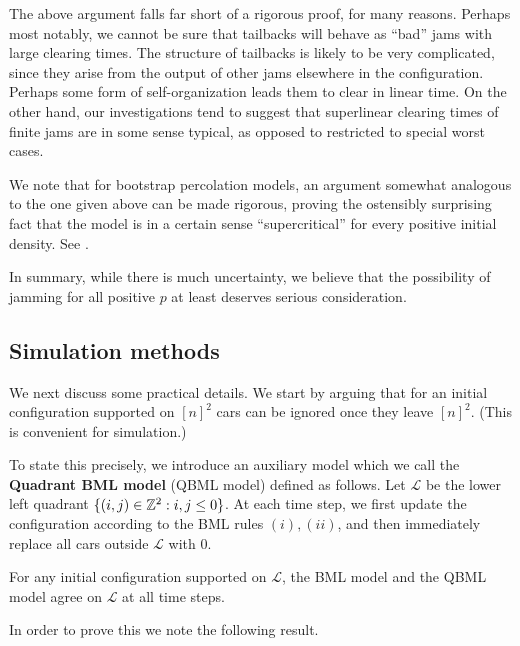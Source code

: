 \documentclass[reqno]{amsart}
\begin{document}
The above argument falls far short of a rigorous proof, for many reasons.  Perhaps most notably, we cannot be sure that tailbacks will behave as ``bad'' jams with large clearing times.  The structure of tailbacks is likely to be very complicated, since they arise from the output of other jams elsewhere in the configuration.  Perhaps some form of self-organization leads them to clear in linear time.  On the other hand, our investigations tend to suggest that superlinear clearing times of finite jams are in some sense typical, as opposed to restricted to special worst cases.

We note that for bootstrap percolation models, an argument somewhat analogous to the one given above can be made rigorous, proving the ostensibly surprising fact that the model is in a certain sense ``supercritical'' for every positive initial density. See \cite{vanenter,schonmann}.

In summary, while there is much uncertainty, we believe that the possibility of jamming for all positive $p$ at least deserves serious consideration.


\subsection*{Simulation methods}
We next discuss some practical details. We start by arguing that for an initial configuration supported on $[n]^2$ cars can be ignored once they leave $[n]^2$. (This is convenient for simulation.)

 To state this precisely, we introduce an auxiliary model which we call the \textbf{Quadrant BML model} (QBML model) defined as follows. Let $\mathcal{L}$ be the lower left quadrant  $\{(i,j) \in \mathbb{Z}^2:i,j\leq 0\}$. At each time step, we first update the configuration according to the BML rules $(i), (ii)$, and then immediately replace all cars outside $\mathcal{L}$ with $0$. 

\begin{proposition} \label{prop:cars_leaving_dont_matter}
    For any initial configuration supported on $\mathcal{L}$, the BML model and the QBML model agree on $\mathcal{L}$ at all time steps.
\end{proposition}

In order to prove this we note the following result.
\end{document}
